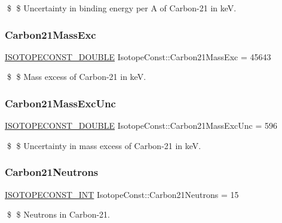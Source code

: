 \$ \$ Uncertainty in binding energy per A of Carbon-\/21 in keV. \mbox{\label{group___isotope_const-_carbon-_c21_ga6e873facbb83896895b0452c8f63fe9f}} 
\subsubsection{\texorpdfstring{Carbon21\+Mass\+Exc}{Carbon21MassExc}}
{\footnotesize\ttfamily \mbox{\hyperlink{group___isotope_const-_macros_ga8f45a7272ce02c0b4c65c44636ed719a}{I\+S\+O\+T\+O\+P\+E\+C\+O\+N\+S\+T\+\_\+\+D\+O\+U\+B\+LE}} Isotope\+Const\+::\+Carbon21\+Mass\+Exc = 45643}

\$ \$ Mass excess of Carbon-\/21 in keV. \mbox{\label{group___isotope_const-_carbon-_c21_ga928e70998ac265903717b88dcd76cf7c}} 
\subsubsection{\texorpdfstring{Carbon21\+Mass\+Exc\+Unc}{Carbon21MassExcUnc}}
{\footnotesize\ttfamily \mbox{\hyperlink{group___isotope_const-_macros_ga8f45a7272ce02c0b4c65c44636ed719a}{I\+S\+O\+T\+O\+P\+E\+C\+O\+N\+S\+T\+\_\+\+D\+O\+U\+B\+LE}} Isotope\+Const\+::\+Carbon21\+Mass\+Exc\+Unc = 596}

\$ \$ Uncertainty in mass excess of Carbon-\/21 in keV. \mbox{\label{group___isotope_const-_carbon-_c21_ga3f197009ca06503c2da7717eade2d0a9}} 
\subsubsection{\texorpdfstring{Carbon21\+Neutrons}{Carbon21Neutrons}}
{\footnotesize\ttfamily \mbox{\hyperlink{group___isotope_const-_macros_ga5f18360b3e99483a35c32d789e62621c}{I\+S\+O\+T\+O\+P\+E\+C\+O\+N\+S\+T\+\_\+\+I\+NT}} Isotope\+Const\+::\+Carbon21\+Neutrons = 15}

\$ \$ Neutrons in Carbon-\/21. \mbox{\label{group___isotope_const-_carbon-_c21_ga0963c93fa59495ab84a9d92ea5ed0674}} 
